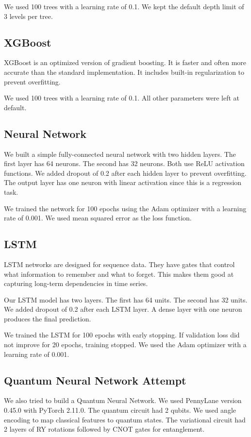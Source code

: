 \documentclass[12pt,a4paper]{article}
\begin{document}
We used 100 trees with a learning rate of 0.1. We kept the default depth limit of 3 levels per tree.

\subsection{XGBoost}
XGBoost is an optimized version of gradient boosting. It is faster and often more accurate than the standard implementation. It includes built-in regularization to prevent overfitting.

We used 100 trees with a learning rate of 0.1. All other parameters were left at default.

\subsection{Neural Network}
We built a simple fully-connected neural network with two hidden layers. The first layer has 64 neurons. The second has 32 neurons. Both use ReLU activation functions. We added dropout of 0.2 after each hidden layer to prevent overfitting. The output layer has one neuron with linear activation since this is a regression task.

We trained the network for 100 epochs using the Adam optimizer with a learning rate of 0.001. We used mean squared error as the loss function.

\subsection{LSTM}
LSTM networks are designed for sequence data. They have gates that control what information to remember and what to forget. This makes them good at capturing long-term dependencies in time series.

Our LSTM model has two layers. The first has 64 units. The second has 32 units. We added dropout of 0.2 after each LSTM layer. A dense layer with one neuron produces the final prediction.

We trained the LSTM for 100 epochs with early stopping. If validation loss did not improve for 20 epochs, training stopped. We used the Adam optimizer with a learning rate of 0.001.

\subsection{Quantum Neural Network Attempt}
We also tried to build a Quantum Neural Network. We used PennyLane version 0.45.0 with PyTorch 2.11.0. The quantum circuit had 2 qubits. We used angle encoding to map classical features to quantum states. The variational circuit had 2 layers of RY rotations followed by CNOT gates for entanglement.
\end{document}
